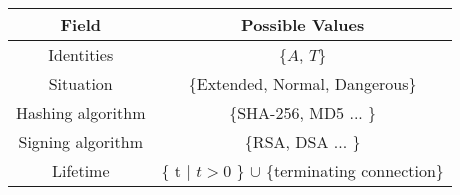 \begin{tabular}{|c|c|}
\toprule
\textbf{Field} & \textbf{Possible Values}  \\
\midrule
Identities &  \{$A$, $T$\} \\
\midrule
Situation &  \{Extended, Normal, Dangerous\} \\
\midrule
Hashing algorithm &  \{SHA-256, MD5 ... \} \\
\midrule
Signing algorithm & \{RSA, DSA ... \} \\
\midrule
Lifetime &  \{ t $|$ $ t > 0 $ \} $\cup$ \{terminating connection\} \\
\bottomrule
\end{tabular}